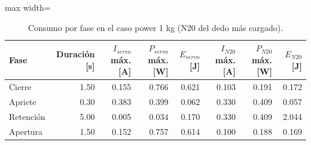 \begin{table}[H]
\centering

\begin{adjustbox}{max width=\textwidth}
\begin{tabular}{|l|r|r|r|r|r|r|r|}
\hline
\textbf{Fase} & \textbf{Duración [s]} & \textbf{$I_{servo}$ máx. [A]} & \textbf{$P_{servo}$ máx. [W]} & \textbf{$E_{servo}$ [J]} & \textbf{$I_{N20}$ máx. [A]} & \textbf{$P_{N20}$ máx. [W]} & \textbf{$E_{N20}$ [J]} \\ \hline
Cierre & 1.50 & 0.155 & 0.766 & 0.621 & 0.103 & 0.191 & 0.172 \\ \hline
Apriete & 0.30 & 0.383 & 0.399 & 0.062 & 0.330 & 0.409 & 0.057 \\ \hline
Retención & 5.00 & 0.005 & 0.034 & 0.170 & 0.330 & 0.409 & 2.044 \\ \hline
Apertura & 1.50 & 0.152 & 0.757 & 0.614 & 0.100 & 0.188 & 0.169 \\ \hline
\end{tabular}
\end{adjustbox}
\caption{Consumo por fase en el caso power 1 kg (N20 del dedo más cargado).}
\label{tab:fases}
\end{table}